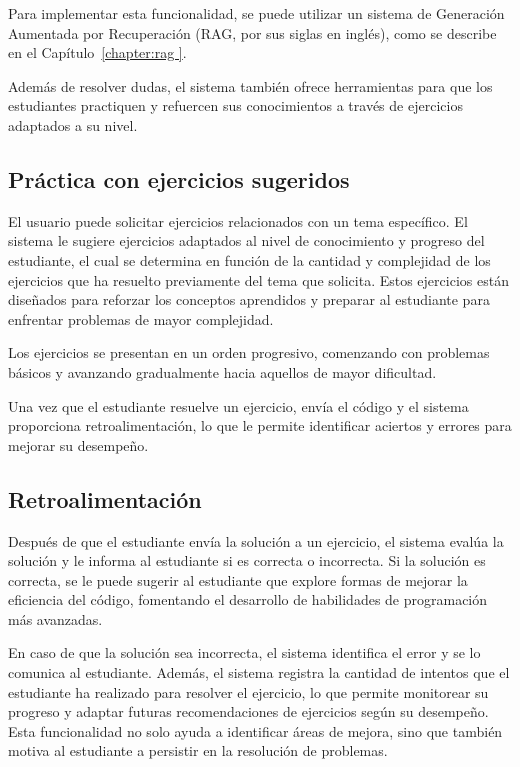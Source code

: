\documentclass{article}
\begin{document}
Para implementar esta funcionalidad, se puede utilizar un sistema de Generación Aumentada por Recuperación (RAG, por sus siglas en inglés), como se describe en el Capítulo~\ref{chapter:rag }. 

Además de resolver dudas, el sistema también ofrece herramientas para que los estudiantes practiquen y refuercen sus conocimientos a través de ejercicios adaptados a su nivel.

\subsection{Práctica con ejercicios sugeridos}

El usuario puede solicitar ejercicios relacionados con un tema específico. El sistema le sugiere ejercicios adaptados al nivel de conocimiento y progreso del estudiante, el cual se determina en función de la cantidad y complejidad de los ejercicios que ha resuelto previamente del tema que solicita. Estos ejercicios están diseñados para reforzar los conceptos aprendidos y preparar al estudiante para enfrentar problemas de mayor complejidad.

Los ejercicios se presentan en un orden progresivo, comenzando con problemas básicos y avanzando gradualmente hacia aquellos de mayor dificultad.

Una vez que el estudiante resuelve un ejercicio, envía el código y el sistema proporciona retroalimentación, lo que le permite identificar aciertos y errores para mejorar su desempeño.

\subsection{Retroalimentación}

Después de que el estudiante envía la solución a un ejercicio, el sistema evalúa la solución y le informa al estudiante si es correcta o incorrecta. Si la solución es correcta, se le puede sugerir al estudiante que explore formas de mejorar la eficiencia del código, fomentando el desarrollo de habilidades de programación más avanzadas.

En caso de que la solución sea incorrecta, el sistema identifica el error y se lo comunica al estudiante. Además, el sistema registra la cantidad de intentos que el estudiante ha realizado para resolver el ejercicio, lo que permite monitorear su progreso y adaptar futuras recomendaciones de ejercicios según su desempeño. Esta funcionalidad no solo ayuda a identificar áreas de mejora, sino que también motiva al estudiante a persistir en la resolución de problemas.
\end{document}
